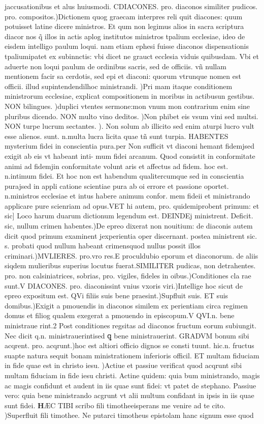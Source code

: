 \documentclass{article}
\begin{document}
\begin{pages}
jaccusationibus et alus huiusmodi.  \pend\pstart CDIACONES. pro. diaconos similiter pudicos. pro. compositos.)Dictionem quog graecam interpres reli quit diacones: quum potuisset latine dicere ministros. Et qum non legimus alios in sacra scriptura diacor nos q̃ illos in actis aplog institutos ministros tpalium ecclesiae, ideo de eisdem intelligo paulum loqui. nam etiam ephesi fuisse diaconos dispensationis tpaliumipatet ex subinnctis: vbi dicet ne grauct ecclesia viduis quibusdam. Vbi et aduerte non loqui paulum de ordinibus sacris, sed de officiis. vñ nullam mentionem facir sa cerdotis, sed epi et diaconi: quorum vtrunque nomen est officii. illud supintendendilhoc ministrandi. )Pri mam itaque conditionem ministrorum ecclesiae, explicat compositionem in moribus in actibusun gestibus. NON bilingues. )duplici vtentes sermone:mon vnum mon contrarium enim sine pluribus dicendo. NON multo vino deditos. )Non phibet eis vsum vini sed multsi. NON turpe lucrum sectantes. ). Non solum ab illicito sed enim aturpi lucro vult esse alienos. sunt. n.multa lucra licita quae tñ sunt turpia. HABENTES mysterium fidei in conscientia pura.per Non sufficit vt diaconi hemant fidemjsed exigit ab eis vt habeant inti- mum fidei arcanum. Quod consistit in conformitate animi ad fidemjin conformitate volunt aris et affectus ad fidem. hoc est. n.intimum fidei. Et hoc non est habendum qualitercumque sed in conscientia purajsed in appli catione scientiae pura ab oi errore et passione oportet. n.ministros ecclesiae et intus habere animum confor. mem fideii et ministrando applicare pure scienriam ad opus.VET hi autem, pro. quidemiprobent primum: et sic] Loco harum duarum dictionum legendum est. DEINDEj ministrent. Deficit. sic, nullum crimen habentes.)De epreo dixerat non nouitium: de diaconis autem dicit quod primum examinent jexperientia oper discernant. postea ministrent sic. s. probati quod nullum habeant crimensquod nullus possit illos criminari.)MVLIERES. pro.vro res.E proculdubio eporum et diaconorum. de aliis siqdem mulieribus superius locutus fuerat.SIMILITER pudicas, non detrahentes. pro. non calsiniatrices, sobrias, pro. vigiles, fideles in oibus.)Conditiones cla rae sunt.V DIACONES. pro. diaconissint vnius vxoris viri.)Intellige hoc sicut de epreo expositum est. QVi filiis suis bene praesint.)Supfluit suis. ET suis domibus.)Exigit a pmouendis in diaconos similem ex perientiam circa regimen domus et filiog qualem exegerat a pmouendo in episcopum.V QVI.n. bene ministraue rint.2 Post conditiones regsitas ad diaconos fructum eorum subiungit. Nec dicit q.n. ministrauerintised ꝗ bene ministrauerint. GRADVM bonum sibi acqrent. pro. acqrunt.)hoc est altiori officio dignos se consti tuunt. hic.n. fructus suapte natura sequit bonam ministrationem inferioris officil. ET multam fiduciam in fide quae est in christo iesu. )Actiue et passiue verificat quod acqrunt sibi multam fiduciam in fide iesu christi. Actine quidem: quia bum ministrando, magis ac magis confidunt et audent in iis quae sunt fidei: vt patet de stephano. Passiue vero: quia bene ministrando acgrunt vt alii multum confidant in ipsis in iis quae sunt fidei.  \pend\pstart \huge\textbf{H}\normalsize ÆC TIBI scribo fili timotheeisperans me venire ad te cito. )Superfluit fili timothee. Ne putarci timotheus epistolam hanc signum esse quod 
\end{pages}
\end{document}
